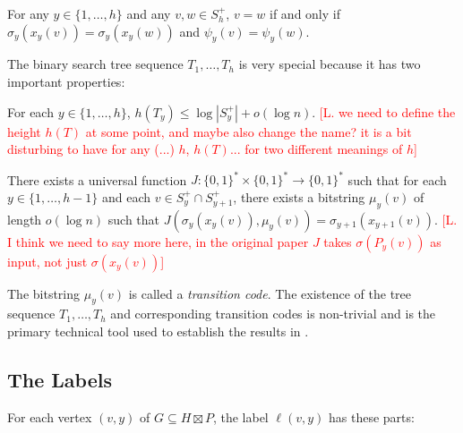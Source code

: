 \documentclass{patmorin}
\begin{document}
\begin{compactenum}[(P1)]\setcounter{enumi}{3}
    \item For any $y\in\{1,\ldots,h\}$ and any $v,w\in S^+_h$, $v=w$ if and only if $\sigma_y(x_y(v))= \sigma_y(x_y(w)) $ and $\psi_y(v)=\psi_y(w)$.\label{unique-match}
\end{compactenum}

The binary search tree sequence $T_1,\ldots,T_h$ is very special because it has two important properties:
\begin{compactenum}[(P1)]\setcounter{enumi}{4}
    \item For each $y\in\{1,\ldots,h\}$, $h(T_y)\le \log|S^+_y|+o(\log n)$. \textcolor{red}{[L. we need to define the height $h(T)$ at some point, and maybe also change the name? it is a bit disturbing to have for any (...) $h$, $h(T)...$ for two different meanings of $h$]} \label{tree-height}
    \item There exists a universal function $J:\{0,1\}^*\times\{0,1\}^*\to\{0,1\}^*$ such that for each $y\in\{1,\ldots,h-1\}$ and each $v\in S^+_y\cap S^+_{y+1}$, there exists a bitstring $\mu_y(v)$ of length $o(\log n)$ such that $J(\sigma_{y}(x_y(v)),\mu_y(v))=\sigma_{y+1}(x_{y+1}(v))$. \textcolor{red}{[L. I think we need to say more here, in the original paper $J$ takes $\sigma(P_y(v))$ as input, not just $\sigma(x_y(v))$]}\label{transition-code-v}
\end{compactenum}
The bitstring $\mu_y(v)$ is called a \emph{transition code}.  The existence of the tree sequence $T_1,\ldots,T_h$ and corresponding transition codes is non-trivial and is the primary technical tool used to establish the results in \cite{dujmovic.esperet.ea:adjacency,esperet.joret.ea:sparse}.

\subsection{The Labels}
\label{labels-i}

For each vertex $(v,y)$ of $G\subseteq H\boxtimes P$, the label $\ell(v,y)$ has these parts:
\end{document}
